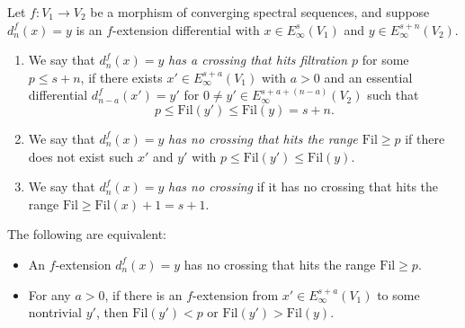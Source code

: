 \begin{definition}\label{prereq:def:crossing}
    \leanok
    Let $f: V_1 \to V_2$ be a morphism of converging spectral sequences, and suppose $d_n^f(x) = y$ is an $f$-extension differential with $x \in E_\infty^{s}(V_1)$ and $y \in E_\infty^{s+n}(V_2)$.
    \begin{enumerate}
        \item We say that $d_n^f(x) = y$ \emph{has a crossing that hits filtration $p$} for some $p \le s+n$, if there exists $x' \in E_\infty^{s+a}(V_1)$ with $a > 0$ and an essential differential $d_{n-a}^f(x') = y'$ for $0 \ne y' \in E_\infty^{s+a+(n-a)}(V_2)$ such that
        $$p \le \mathrm{Fil}(y') \le \mathrm{Fil}(y) = s + n.$$
        \item We say that $d_n^f(x) = y$ \emph{has no crossing that hits the range $\mathrm{Fil} \ge p$} if there does not exist such $x'$ and $y'$ with $p \le \mathrm{Fil}(y') \le \mathrm{Fil}(y)$.
        \item We say that $d_n^f(x) = y$ \emph{has no crossing} if it has no crossing that hits the range $\mathrm{Fil} \ge \mathrm{Fil}(x) + 1 = s + 1$.
    \end{enumerate}
\end{definition}

\begin{remark}\label{prereq:rem:no-crossing-equiv}
    The following are equivalent:
    \begin{itemize}
        \item An $f$-extension $d_n^f(x) = y$ has no crossing that hits the range $\mathrm{Fil} \ge p$.
        \item For any $a > 0$, if there is an $f$-extension from $x' \in E_\infty^{s+a}(V_1)$ to some nontrivial $y'$, then $\mathrm{Fil}(y') < p$ or $\mathrm{Fil}(y') > \mathrm{Fil}(y)$.
    \end{itemize}
\end{remark}

